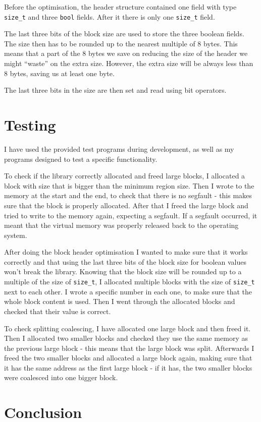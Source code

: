 \documentclass{article}
\begin{document}
Before the optimisation, the header structure contained one field with type \lstinline{size_t} and three \lstinline{bool} fields. After it there is only one \lstinline{size_t} field.

The last three bits of the block size are used to store the three boolean fields. The size then has to be rounded up to the nearest multiple of 8 bytes. This means that a part of the 8 bytes we save on reducing the size of the header we might ``waste'' on the extra size. However, the extra size will be always less than 8 bytes, saving us at least one byte.

The last three bits in the size are then set and read using bit operators.

\section{Testing}

I have used the provided test programs during development, as well as my programs designed to test a specific functionality.

To check if the library correctly allocated and freed large blocks, I allocated a block with size that is bigger than the minimum region size. Then I wrote to the memory at the start and the end, to check that there is no segfault - this makes sure that the block is properly allocated. After that I freed the large block and tried to write to the memory again, expecting a segfault. If a segfault occurred, it meant that the virtual memory was properly released back to the operating system.

After doing the block header optimisation I wanted to make sure that it works correctly and that using the last three bits of the block size for boolean values won't break the library. Knowing that the block size will be rounded up to a multiple of the size of \lstinline{size_t}, I allocated multiple blocks with the size of \lstinline{size_t} next to each other. I wrote a specific number in each one, to make sure that the whole block content is used. Then I went through the allocated blocks and checked that their value is correct.

To check splitting coalescing, I have allocated one large block and then freed it. Then I allocated two smaller blocks and checked they use the same memory as the previous large block - this means that the large block was split. Afterwards I freed the two smaller blocks and allocated a large block again, making sure that it has the same address as the first large block - if it has, the two smaller blocks were coalesced into one bigger block.

\section{Conclusion}



\end{document}
